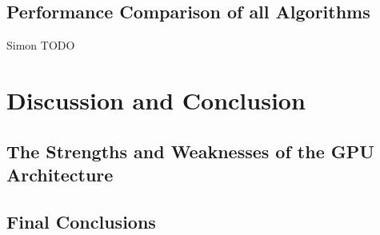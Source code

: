 \documentclass[11pt]{article} %
\begin{document}
\subsection{Performance Comparison of all Algorithms}

Simon TODO

\section{Discussion and Conclusion}
\label{conclusion-section}

\subsection{The Strengths and Weaknesses of the GPU Architecture}

\subsection{Final Conclusions}
\end{document}
